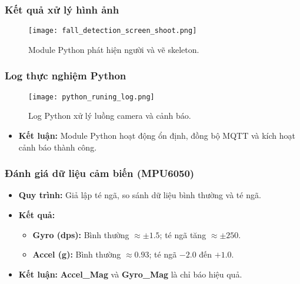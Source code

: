 \begin{frame}[t]
\frametitle{Kết quả xử lý hình ảnh}
\begin{figure}
    \centering
    \texttt{[image: fall\_detection\_screen\_shoot.png]}
    \caption{Module Python phát hiện người và vẽ skeleton.}
\end{figure}
\end{frame}

\begin{frame}[fragile]
\frametitle{Log thực nghiệm Python}
\begin{figure}[H]
    \centering
    \texttt{[image: python\_runing\_log.png]}
    \caption{Log Python xử lý luồng camera và cảnh báo.}
\end{figure}
\begin{itemize}
    \item \textbf{Kết luận:} Module Python hoạt động ổn định, đồng bộ MQTT và kích hoạt cảnh báo thành công.
\end{itemize}
\end{frame}

\begin{frame}[fragile]
\frametitle{Đánh giá dữ liệu cảm biến (MPU6050)}
\begin{itemize}
    \item \textbf{Quy trình:} Giả lập té ngã, so sánh dữ liệu bình thường và té ngã.
    \item \textbf{Kết quả:}
    \begin{itemize}
        \item \textbf{Gyro (dps):} Bình thường $\approx \pm 1.5$; té ngã tăng $\approx \pm 250$.
        \item \textbf{Accel (g):} Bình thường $\approx 0.93$; té ngã $-2.0$ đến $+1.0$.
    \end{itemize}
    \item \textbf{Kết luận:} \textbf{Accel\_Mag} và \textbf{Gyro\_Mag} là chỉ báo hiệu quả.
\end{itemize}
\end{frame}


